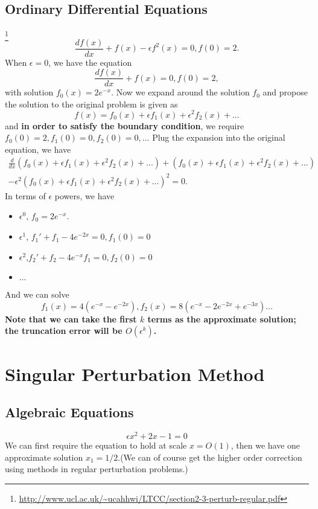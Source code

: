 \begin{refsection}
\subsection{Ordinary Differential Equations}
\begin{example}\footnote{\url{http://www.ucl.ac.uk/~ucahhwi/LTCC/section2-3-perturb-regular.pdf}}
	$$\frac{df(x)}{dx} + f(x) -\epsilon f^2(x) = 0, f(0) = 2.$$
When $\epsilon = 0$, we have the equation
$$\frac{df(x)}{dx} + f(x) = 0, f(0) = 2,$$
with solution $f_0(x) = 2e^{-x}$.
Now we expand around the solution $f_0$ and propose the solution to the original problem is given as
$$f(x) = f_0(x) + \epsilon f_1(x) + \epsilon^2 f_2(x) + ...$$
and \textbf{in order to satisfy the boundary condition}, we require $f_0(0) = 2,f_1(0) = 0,f_2(0) = 0, ...$
Plug the expansion into the original equation, we have
\begin{align*}
\frac{d}{dx}(f_0(x) + \epsilon f_1(x) + \epsilon^2 f_2(x) + ...) + (f_0(x) + \epsilon f_1(x) + \epsilon^2 f_2(x) + ...)\\ - \epsilon^2 (f_0(x) + \epsilon f_1(x) + \epsilon^2 f_2(x) + ...)^2 = 0.
\end{align*}
In terms of $\epsilon$ powers, we have
\begin{itemize}
	\item $\epsilon^0$, $f_0 = 2e^{-x}$.
	\item $\epsilon^1$, $f_1' + f_1 - 4e^{-2x} = 0,f_1(0) = 0$
	\item $\epsilon^2$,$f_2' + f_2 -4e^{-x}f_1 = 0,f_2(0) = 0$
	\item $\dots$
\end{itemize}
And we can solve
$$f_1(x) = 4(e^{-x} - e^{-2x}), f_2(x) = 8(e^{-x} - 2e^{-2x} + e^{-3x}) ...$$
\textbf{Note that we can take the first $k$ terms as the approximate solution; the truncation error will be $O(\epsilon^k)$.} 
\end{example}



\section{Singular Perturbation Method}


\subsection{Algebraic Equations}
\begin{example}\cite[25]{holmes2012introduction}
	$$\epsilon x^2 + 2x - 1 = 0$$
We can first require the equation to hold at scale $x = O(1)$, then we have one approximate solution $x_1 = 1/2$.(We can of course get the higher order correction using methods in regular perturbation problems.)\\


\end{example}
\end{refsection}
